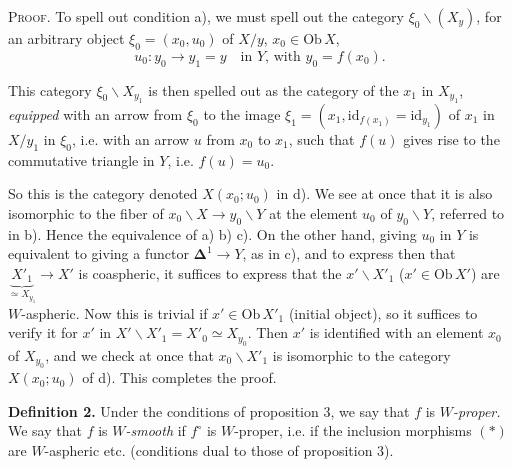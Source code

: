 \documentclass[11pt,leqno]{article}
\newcommand{\printedpage}[1]{\marginpar{\footnotesize p.~#1}}
\newcommand{\msp}[1]{\marginpar{\footnotesize [#1]}}
\newcommand{\Ob}{\mathrm{Ob}\,}
\begin{document}
\msp{page 27}\textsc{Proof.} To spell out condition a), we must spell out the category $\xi_0\backslash(X_y)$, for an arbitrary object $\xi_0 = (x_0, u_0)$ of $X/y$, $x_0 \in \Ob X$,
\[
u_0 : y_0 \longrightarrow y_1 = y \quad \text{in $Y$, with $y_0 = f(x_0)$.}
\]

This category $\xi_0\backslash X_{y_1}$ is then spelled out as the category of the $x_1$ in $X_{y_1}$, \textit{equipped} with an arrow from $\xi_0$ to the image $\xi_1 = (x_1, \mathrm{id}_{f(x_1)} = \mathrm{id}_{y_1})$ of $x_1$ in $X/y_1$ in $\xi_0$, i.e. with an arrow $u$ from $x_0$ to $x_1$, such that $f(u)$ gives rise to the commutative triangle in $Y$, i.e. $f(u) = u_0$. %

\begin{center}
\end{center}

So this is the category denoted $X(x_0;u_0)$ in d). We see at once that it is also isomorphic to the fiber of $x_0\backslash X \longrightarrow y_0\backslash Y$ at the element $u_0$ of $y_0\backslash Y$, referred to in b). Hence the equivalence of a) b) c). On the other hand, giving $u_0$ in $Y$ is equivalent to giving a functor $\mathbf{\Delta}^1 \longrightarrow Y$, as in c), and to express then that $\underbrace{X'_1}_{\simeq X_{y_1}} \longrightarrow X'$ is coaspheric, it suffices to express that the $x'\backslash X'_1$ ($x' \in \Ob X'$) are $W$-aspheric. Now this is trivial if $x' \in \Ob X'_1$ (initial object), so it suffices to verify it for $x'$ in $X'\backslash X'_1 = X'_0 \simeq X_{y_0}$. Then $x'$ is identified with an element $x_0$ of $X_{y_0}$, and we check at once that $x_0\backslash X'_1$ is isomorphic to the category $X(x_0;u_0)$ of d). This completes the proof.

\printedpage{23}

\msp{page 28}\textbf{Definition 2.} Under the conditions of proposition 3, we say that $f$ is \textit{$W$-proper.} We say that $f$ is \textit{$W$-smooth} if $f^{\circ}$ is $W$-proper, i.e. if the inclusion morphisms $(*)$ are $W$-aspheric etc. (conditions dual to those of proposition 3).
\end{document}
